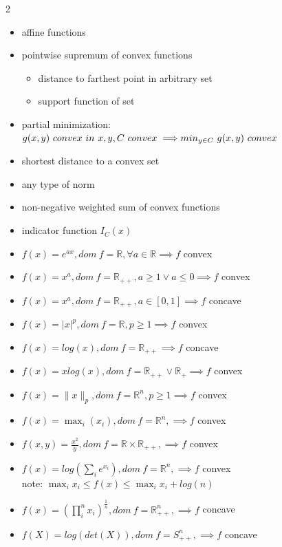 \documentclass[8pt]{extarticle}
\newcommand{\R}{\mathbb{R}}
\newcommand{\norm}[1]{\|#1\|}
\begin{document}
\begin{multicols*}{2}
  \begin{itemize}
  \item affine functions
  \item pointwise supremum of convex functions
    \begin{itemize}
    \item distance to farthest point in arbitrary set
    \item support function of set
    \end{itemize}
  \item partial minimization:\\
    $g(x,y)\ convex\ in\ x,y, C\ convex \implies\\ min_{y\in C}\ g(x,y)\ convex$
  \item shortest distance to a convex set
  \item any type of norm
  \item non-negative weighted sum of convex functions
  \item indicator function $I_C(x)$
  \item $f(x)=e^{ax}, dom\ f=\R, \forall a \in \R \implies f$ convex
  \item $f(x)=x^a, dom\ f=\R_{++}, a \geq 1 \vee a \le 0 \implies f$ convex
  \item $f(x)=x^a, dom\ f=\R_{++}, a \in [0,1] \implies f$ concave
  \item $f(x)=|x|^p, dom\ f = \R, p \geq 1 \implies f$ convex
  \item $f(x) = log(x), dom\ f = \R_{++} \implies f$ concave
  \item $f(x) = x log(x), dom\ f = \R_{++} \vee \R_{+} \implies f$ convex
  \item $f(x)=\norm{x}_p, dom\ f = \R^n, p \geq 1 \implies f$ convex
  \item $f(x) = \max_i(x_i), dom\ f = \R^n, \implies f$ convex
  \item $f(x,y) = \frac{x^2}{y}, dom\ f = \R \times \R_{++}, \implies f$ convex
  \item $f(x) = log(\sum_i e^{x_i}), dom\ f = \R^n, \implies f$ convex\\
    note: $\max_i x_i \leq f(x) \leq \max_i x_i + log(n)$
  \item $f(x) = (\prod_i^n x_i)^{\frac{1}{n}}, dom\ f = \R_{++}^n, \implies f$ concave
  \item $f(X) = log(det(X)), dom\ f = S_{++}^n, \implies f$ concave
  \end{itemize}
  

\end{multicols*}
\end{document}
